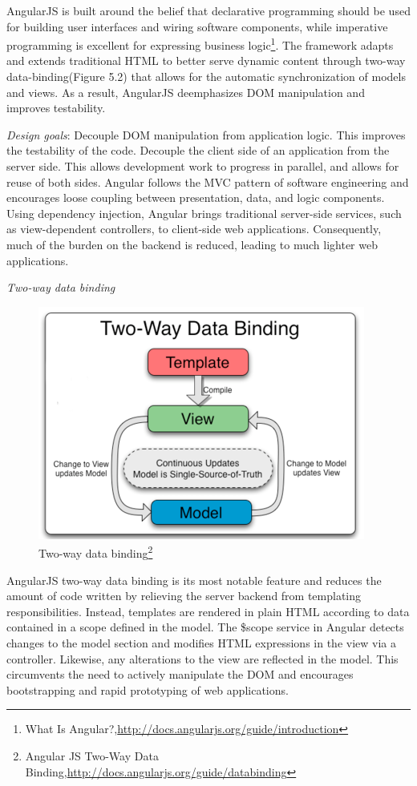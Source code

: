 	AngularJS is built around the belief that declarative programming should be used for building user interfaces and wiring software components, while imperative programming is excellent for expressing business logic\footnote{What Is Angular?,\url{http://docs.angularjs.org/guide/introduction}}. The framework adapts and extends traditional HTML to better serve dynamic content through two-way data-binding(Figure 5.2) that allows for the automatic synchronization of models and views. As a result, AngularJS deemphasizes DOM manipulation and improves testability.

	\emph{Design goals}:
	\newline
	Decouple DOM manipulation from application logic. This improves the testability of the code. Decouple the client side of an application from the server side. This allows development work to progress in parallel, and allows for reuse of both sides.	Angular follows the MVC pattern of software engineering and encourages loose coupling between presentation, data, and logic components. Using dependency injection, Angular brings traditional server-side services, such as view-dependent controllers, to client-side web applications. Consequently, much of the burden on the backend is reduced, leading to much lighter web applications.

   \emph{Two-way data binding}
   \begin{figure}[!ht]
		\centering
		\includegraphics[scale=0.8]{images/2wayBinding.png}   
		\caption[Two-way data binding]{Two-way data binding\footnote{Angular JS Two-Way Data Binding,\url{http://docs.angularjs.org/guide/databinding}}}
		\label{img:interfaces}                           
		\end{figure}
	AngularJS two-way data binding is its most notable feature and reduces the amount of code written by relieving the server backend from templating responsibilities. Instead, templates are rendered in plain HTML according to data contained in a scope defined in the model. The \$scope service in Angular detects changes to the model section and modifies HTML expressions in the view via a controller. Likewise, any alterations to the view are reflected in the model. This circumvents the need to actively manipulate the DOM and encourages bootstrapping and rapid prototyping of web applications.

